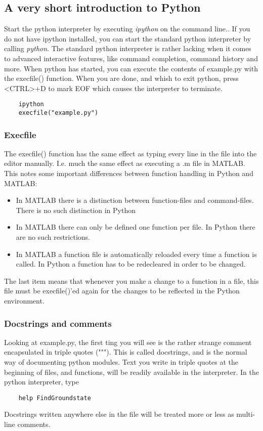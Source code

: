 \subsection{A very short introduction to Python}
Start the python interpreter by executing \textit{ipython} on the command line.. If you do not have ipython installed, 
you can start the standard python interpreter by calling \textit{python}. The standard python 
interpreter is rather lacking when it comes to advanced interactive features, like command completion, command history and more. When python has started, you can execute the contents of example.py with the execfile() function. When you are done, 
and whish to exit python, press <CTRL>+D to mark EOF which causes the interpreter to terminate.
\begin{verbatim}
	ipython
	execfile("example.py")
\end{verbatim}

\subsubsection*{Execfile}
The execfile() function has the same effect as typing every line in the file into the editor manually. I.e. much the 
same effect as executing a .m file in MATLAB. This notes some important differences between function handling in 
Python and MATLAB:
\begin{itemize}
\item In MATLAB there is a distinction between function-files and command-files. There is no such distinction in Python
\item In MATLAB there can only be defined one function per file. In Python there are no such restrictions.
\item In MATLAB a function file is automatically reloaded every time a function is called. In Python a function has to
be redecleared in order to be changed. 
\end{itemize}
The last item means that whenever you make a change to a function in a file, this file must be execfile()'ed again for the
changes to be reflected in the Python environment.

\subsubsection*{Docstrings and comments}
Looking at example.py, the first ting you will see is the rather strange comment encapsulated in triple quotes ("""). This
is called docstrings, and is the normal way of documenting python modules. Text you write in triple quotes at the beginning 
of files, and functions, will be readily available in the interpreter. In the python interpreter, type
\begin{verbatim}
	help FindGroundstate
\end{verbatim}
Docstrings written anywhere else in the file will be treated more or less as multi-line comments. 

